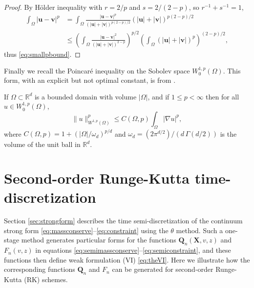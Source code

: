 \documentclass[final,onefignum]{siamart190516}
\newcommand\bu{\mathbf{u}}
\newcommand\bv{\mathbf{v}}
\newcommand\bQ{\mathbf{Q}}
\newcommand\bX{\mathbf{X}}
\newcommand{\grad}{\nabla}
\newcommand\RR{\mathbb{R}}
\begin{document}
\begin{proof}  By H\"older inequality with $r=2/p$ and $s=2/(2-p)$, so $r^{-1}+s^{-1}=1$,
\begin{align*}
\int_\Omega |\bu - \bv|^p &= \int_\Omega \frac{|\bu-\bv|^p}{\left(|\bu|+|\bv|\right)^{p(2-p)/2}} \left(|\bu|+|\bv|\right)^{p(2-p)/2} \\
    &\le \left(\int_\Omega \frac{|\bu-\bv|^2}{\left(|\bu|+|\bv|\right)^{2-p}}\right)^{p/2} \left(\int_\Omega \left(|\bu|+|\bv|\right)^p\right)^{(2-p)/2},
\end{align*}
thus \eqref{eq:smallpbound}.
\end{proof}

Finally we recall the Poincar\'e inequality on the Sobolev space $W_0^{1,p}(\Omega)$.  This form, with an explicit but not optimal constant, is from \cite[section 7.8]{GilbargTrudinger2001}.

\begin{lemma} \label{lem:poincare}  If $\Omega\subset \RR^d$ is a bounded domain with volume $|\Omega|$, and if $1\le p<\infty$ then for all $u\in W_0^{1,p}(\Omega)$,
\begin{equation}
  \|u\|_{W^{1,p}(\Omega)}^p \le C(\Omega,p) \int_\Omega |\grad u|^p, \label{eq:poincare}
\end{equation}
where $C(\Omega,p)=1+(|\Omega|/\omega_d)^{p/d}$ and $\omega_d=(2 \pi^{d/2})/(d\,\Gamma(d/2))$ is the volume of the unit ball in $\RR^d$.
\end{lemma}


\section{Second-order Runge-Kutta time-discretization}  \label{app:rk2}  Section \ref{sec:strongform} describes the time semi-discretization of the continuum strong form \eqref{eq:massconserve}--\eqref{eq:constraint} using the $\theta$ method.  Such a one-stage method generates particular forms for the functions $\bQ_n(\bX,v,z)$ and $F_n(v,z)$ in equations \eqref{eq:semimassconserve}--\eqref{eq:semiconstraint}, and these functions then define weak formulation (VI) \eqref{eq:theVI}.  Here we illustrate how the corresponding functions $\bQ_n$ and $F_n$ can be generated for second-order Runge-Kutta (RK) schemes.
\end{document}
